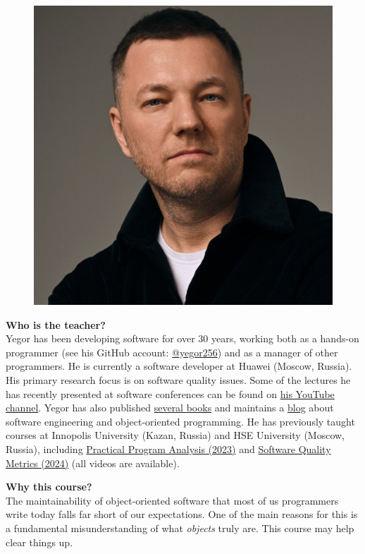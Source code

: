 \documentclass[nobrand,anonymous,nodate,nosecurity]{huawei}
\begin{document}
\begin{figure}%
\raggedleft%
\includegraphics[width=\linewidth]{face-1024x1024.jpg}%
\end{figure}
\textbf{Who is the teacher?}\\
Yegor has been developing software for over 30 years, working both as a hands-on programmer (see his GitHub account: \href{https://github.com/yegor256}{@yegor256}) and as a manager of other programmers.
He is currently a software developer at Huawei (Moscow, Russia).
His primary research focus is on software quality issues.
Some of the lectures he has recently presented at software conferences can be found on \href{https://www.youtube.com/channel/UCr9qCdqXLm2SU0BIs6d_68Q}{his YouTube channel}.
Yegor has also published \href{https://www.yegor256.com/books.html}{several books} and maintains a \href{https://www.yegor256.com/contents.html}{blog} about software engineering and object-oriented programming.
He has previously taught courses at Innopolis University (Kazan, Russia) and HSE University (Moscow, Russia), including \href{https://github.com/yegor256/ppa}{Practical Program Analysis (2023)} and \href{https://github.com/yegor256/sqm}{Software Quality Metrics (2024)} (all videos are available).

\textbf{Why this course?}\\
The maintainability of object-oriented software that most of us programmers write today falls far short of our expectations.
One of the main reasons for this is a fundamental misunderstanding of what \emph{objects} truly are.
This course may help clear things up.
\end{document}
